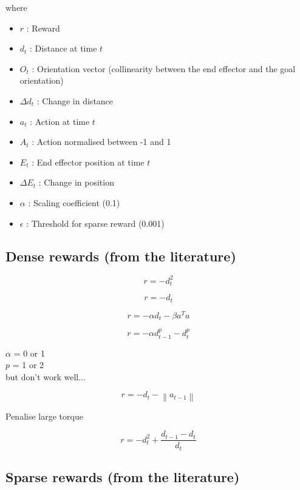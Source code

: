 \documentclass{article}
\newcommand{\norm}[1]{\left\lVert#1\right\rVert}
\begin{document}
where
\begin{itemize}  
\item $r$ : Reward
\item $d_t$ : Distance at time $t$ 
\item $O_t$ : Orientation vector (collinearity between the end effector and the goal orientation)
\item $\Delta d_t$ : Change in distance
\item $a_t$ : Action at time $t$ 
\item $A_t$ : Action normalised between -1 and 1 
\item $E_t$ : End effector position at time $t$
\item $\Delta E_t$ : Change in position
\item $\alpha$ : Scaling coefficient (0.1)
\item $\epsilon$ : Threshold for sparse reward (0.001)
\end{itemize}


\subsection{Dense rewards (from the literature)}

\begin{equation}
r = - d_t^2
\end{equation}


\begin{equation}
r = - d_t
\end{equation}


\begin{equation}
r = -\alpha d_t - \beta a^T a
\end{equation}

\begin{equation}
r = -\alpha d_{t-1}^p - d_t^p 
\end{equation}

$\alpha$ = 0 or 1 \\
$p$ = 1 or 2 \\
but don't work well...

\begin{equation}
r = - d_t -  \norm{a_{t-1}}
\end{equation}

Penalise large torque

\begin{equation}
r = - d_t^2+ \frac{d_{t-1} - d_t}{d_t}
\end{equation}

\subsection{Sparse rewards (from the literature)}
\end{document}
